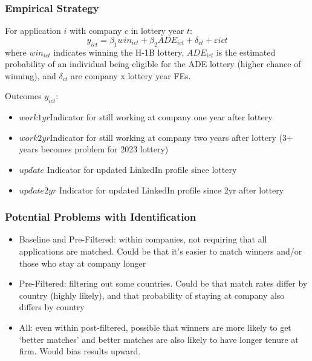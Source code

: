 \documentclass[xcolor=dvipsnames, compress, 12pt, aspectratio=169, handout]{beamer}
\begin{document}
\begin{frame}
    \frametitle{Empirical Strategy}
For application $i$ with company $c$ in lottery year $t$:
\begin{equation*}
    y_{ict} = \beta_1 win_{ict} + \beta_2 ADE_{ict} + \delta_{ct}  + \varepsilon{ict}
\end{equation*}
where $win_{ict}$ indicates winning the H-1B lottery, $ADE_{ict}$ is the estimated probability of an individual being eligible for the ADE lottery (higher chance of winning), and $\delta_{ct}$ are company x lottery year FEs.

\vspace{3mm}
Outcomes $y_{ict}$:
\begin{itemize}
    \item $work1yr$\textemdash Indicator for still working at company one year after lottery 
    \item $work2yr$\textemdash Indicator for still working at company two years after lottery (3+ years becomes problem for 2023 lottery)
    \item $update$ \textemdash Indicator for updated LinkedIn profile since lottery 
    \item $update2yr$ \textemdash Indicator for updated LinkedIn profile since 2yr after lottery 
\end{itemize}
\end{frame}

\begin{frame}
    \frametitle{Potential Problems with Identification}
    \begin{itemize}
        \item Baseline and Pre-Filtered: within companies, not requiring that all applications are matched. Could be that it's easier to match winners and/or those who stay at company longer 
        \item Pre-Filtered: filtering out some countries. Could be that match rates differ by country (highly likely), and that probability of staying at company also differs by country 
        \item All: even within post-filtered, possible that winners are more likely to get `better matches' and better matches are also likely to have longer tenure at firm. Would bias results upward.
    \end{itemize}
\end{frame}
\end{document}
